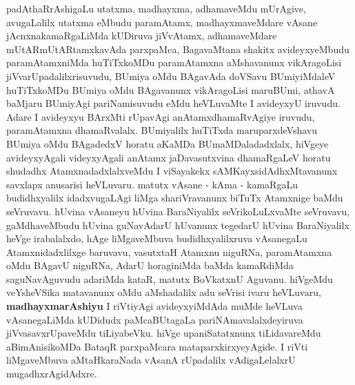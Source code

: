 \begin{artha}
padAthaRrAshigaLu utatxma, madhayxma, adhamaveMdu mUrAgive,
avugaLalilx utatxma eMbudu paramAtamx, madhayxmaveMdare vAsane
jAcnxnakamaRgaLiMda kUDiruva jiVvAtamx, adhamaveMdare
mUtARmUtARtamxkavAda parxpaMca, BagavaMtana shakitx avideyxyeMbudu
paramAtamxniMda huTiTxkoMDu paramAtamxna aMshavanunx vikAragoLisi
jiVvarUpadalilxrisuvudu, BUmiya oMdu BAgavAda doVSavu BUmiyiMdaleV
huTiTxkoMDu BUmiya oMdu BAgavanunx vikAragoLisi maruBUmi, athavA
baMjaru BUmiyAgi pariNamisuvudu eMdu heVLuvaMte I  avideyxyU
iruvudu. Adare I avideyxyu BArxMti rUpavAgi anAtamxdhamaRvAgiye
iruvudu, paramAtamxna dhamaRvalalx. BUmiyalilx huTiTxda maruparxdeVshavu
BUmiya oMdu BAgadedxV horatu aKaMDa BUmaMDaladadxlalx, hiVgeye
avideyxyAgali videyxyAgali anAtamx jaDavasutxvina dhamaRgaLeV horatu
shudadhx AtamxnadadxlalxveMdu I viSayakekx sAMKayxsidAdhxMtavanunx
savxlapx anusarisi heVLuvaru. matutx vAsane - kAma - kamaRgaLu
budidhxyalilx idadxvugaLAgi liMga shariVravanunx biTuTx Atamxnige
baMdu seVruvavu. hUvina vAsaneyu hUvina BaraNiyalilx seVrikoLuLxvaMte
seVruvavu, gaMdhaveMbudu hUvina guNavAdarU hUvanunx tegedarU hUvina
BaraNiyalilx heVge irabalalxdo, hAge liMgaveMbuva budidhxyalilxruva
vAsanegaLu Atamxnidadxlilxge baruvavu, vasutxtaH Atamxnu niguRNa,
paramAtamxna oMdu BAgavU  niguRNa, AdarU horaginiMda baMda kamaRdiMda
saguNavAguvudu adariMda kataR, matutx BoVkatxnU Aguvanu. hiVgeMdu
veYsheVSika matavanunx oMdu aMshadalilx adu seVrisi ivaru heVLuvaru,
\textbf{madhayxmarAshiyu} I riVtiyAgi avideyxyiMdAda muMde heVLuva
vAsanegaLiMda kUDidudx paMcaBUtagaLa pariNAmavalalxdeyiruva
jiVvasavxrUpaveMdu tiLiyabeVku. hiVge upaniSatatxnunx tiLidavareMdu
aBimAnisikoMDa BataqR parxpaMcara mataparxkirxyeyAgide. I riVti
liMgaveMbuva aMtaHkaraNada vAsanA rUpadalilx vAdigaLelalxrU mugadhxrAgidAdxre.
\end{artha}

\centerline{}

